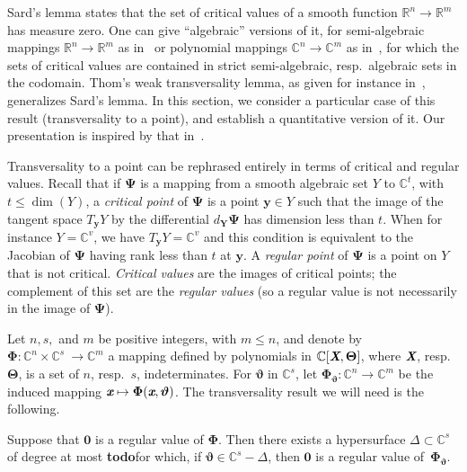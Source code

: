 \documentclass[sigconf]{acmart}
\def\td{{\bf todo}}
\def\Xb{\textit{\textbf{X}}}
\def\Thetab{\bm{\Theta}}
\def\thetab{\bm{\vartheta}}
\def\xb{\textit{\textbf{x}}}
\def\C{\mathbb{C}}
\def\R{\mathbb{R}}
\def\dt{s}
\begin{document}
Sard's lemma states that the set of critical values of a smooth
function $\R^n \to \R^m$ has measure zero. One can give ``algebraic''
versions of it, for semi-algebraic mappings $\R^n \to \R^m$ as
in~\cite[Chapter~9]{bochnak1998real} or polynomial mappings $\C^n \to
\C^m$ as in~\cite[Chapter~3]{Mumford76}, for which the sets of critical
values are contained in strict semi-algebraic, resp.\ algebraic sets
in the codomain. Thom's weak transversality lemma, as given for
instance in~\cite{demazure2000bifurcations}, generalizes Sard's
lemma. In this section, we consider a particular case of this result
(transversality to a point), and establish a quantitative version of
it. Our presentation is inspired by that in~\cite{TWT}.


Transversality to a point can be rephrased entirely in terms of
critical and regular values. Recall that if $\bm \Psi$ is a mapping
from a smooth algebraic set $Y$ to $\C^t$, with $t\le \dim(Y)$, a {\em
  critical point} of $\bm \Psi$ is a point $\bm y \in Y$ such that the
image of the tangent space $T_{\bm y} Y$ by the differential $d_{\bm
  Y} \bm \Psi$ has dimension less than $t$. When for instance
$Y=\C^v$, we have $T_{\bm y} Y=\C^v$ and this condition is equivalent
to the Jacobian of $\bm \Psi$ having rank less than $t$ at $\bm y$.  A
{\em regular point} of $\bm \Psi$ is a point on $Y$ that is not
critical. {\em Critical values} are the images of critical points; the
complement of this set are the {\em regular values} (so a regular
value is not necessarily in the image of $\bm\Psi$).

Let $n,\dt,$ and $m$ be positive integers, with $m \le n$, and denote
by $\bm\Phi :\C^n \times \C^{\dt} ~ \rightarrow \C^{m}$ a mapping
defined by polynomials in $\C[\Xb,\Thetab]$, where $\Xb$,
resp.\ $\Thetab$, is a set of $n$, resp.\ $\dt$, indeterminates.  For
$\thetab$ in $\C^{\dt}$, let $\bm\Phi_{\thetab} : \C^n \rightarrow
\C^{m}$ be the induced mapping $\xb\mapsto \bm\Phi(\xb,\thetab)$.  The
transversality result we will need is the following.

\begin{proposition} \label{prop:weak_t}
  Suppose that $\bm 0$ is a regular value of $\bm\Phi$. Then there
  exists a hypersurface $\Delta \subset \C^{\dt}$ of degree at most
  \td for which, if $\thetab \in \C^{\dt}-\Delta$, then $\bm 0$ is a
  regular value of~$\bm\Phi_{\thetab}$.
\end{proposition}
\end{document}
